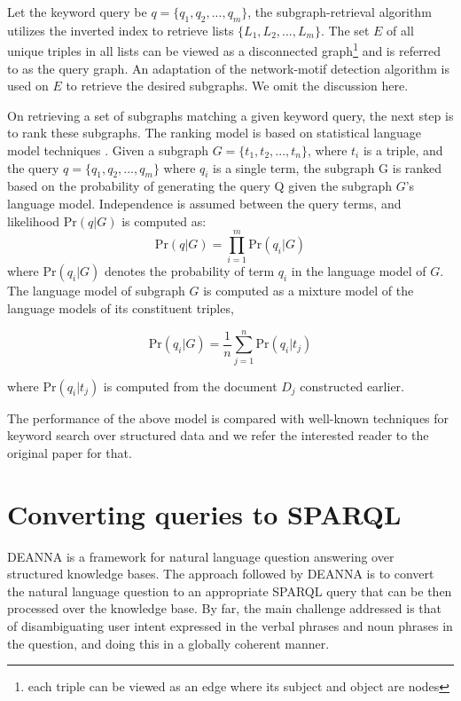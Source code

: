 \documentclass[a4paper, twoside, 12pt]{report}
\begin{document}
 Let the keyword query be $q = \{q_1, q_2, ..., q_m\}$, the subgraph-retrieval algorithm utilizes the inverted index to retrieve lists $\{L_1, L_2, ..., L_m\}$. The set $E$ of all unique triples in all lists can be viewed as a disconnected graph\footnote{each triple can be viewed as an edge where its subject  and object are nodes} and is referred to as the query graph. An adaptation of the network-motif detection algorithm \cite{wernicke2005faster} is used on $E$ to retrieve the desired subgraphs. We omit the discussion here.

 On retrieving a set of subgraphs matching a given keyword query, the next step is to rank these subgraphs. The ranking model is based on statistical language model techniques \cite{ponte1998language}. Given a subgraph $G = \{t_1, t_2, ..., t_n\}$, where $t_i$ is a triple, and the query $q = \{q_1, q_2, ..., q_m\}$ where $q_i$ is a single term, the subgraph G  is ranked based on the probability of generating the query Q given the subgraph $G$'s language model. Independence is assumed between the query terms, and likelihood $\text{Pr}(q|G)$ is computed as:
 $$ \text{Pr}(q|G) = \prod_{i=1}^{m} \text{Pr}(q_i|G)$$
 where $\text{Pr}(q_i|G)$ denotes the probability of term $q_i$ in the language model of $G$. The language model of subgraph $G$ is computed as a mixture model of the language models of its constituent triples,

 $$ \text{Pr}(q_i|G) = \frac{1}{n} \sum_{j=1}^{n} \text{Pr}(q_i|t_j)$$

 where $\text{Pr}(q_i | t_j)$ is computed from the document $D_j$ constructed earlier.

 The performance of the above model is compared with well-known techniques for keyword search over structured data \cite{bhalotia2002keyword, nie2007web} and we refer the interested reader to the original paper \cite{elbassuoni2011keyword} for that.


\section{Converting queries to SPARQL}

DEANNA \cite{yahya2012deep} is a framework for natural language question answering over structured knowledge bases. The approach followed by DEANNA is to convert the natural language question to an appropriate SPARQL query that can be then processed over the knowledge base. By far, the main challenge addressed is that of disambiguating user intent expressed in the verbal phrases and noun phrases in the question, and doing this in a globally coherent manner.
\end{document}
